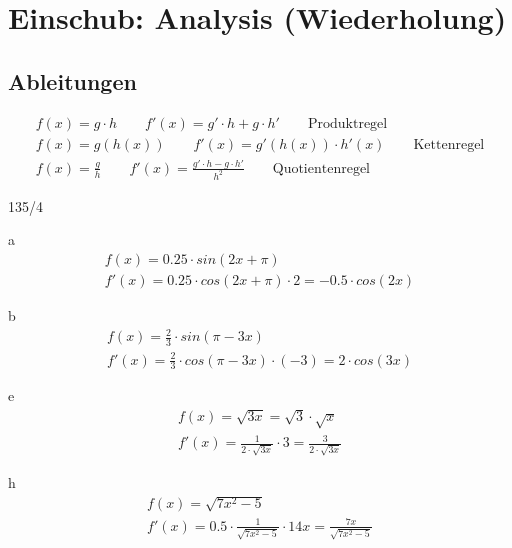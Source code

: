 \section*{Einschub: Analysis (Wiederholung)}
\subsection*{Ableitungen}
\begin{gather*}
  f(x) = g \cdot h \qquad f'(x) = g' \cdot h + g \cdot h' \qquad \text{Produktregel} \\
  f(x) = g(h(x)) \qquad f'(x) = g'(h(x)) \cdot h'(x) \qquad \text{Kettenregel} \\
  f(x) = \frac{g}{h} \qquad f'(x) = \frac{g' \cdot h - g \cdot h'}{h^2} \qquad \text{Quotientenregel}
\end{gather*}
\begin{exercise}{135/4}
  \item [a]
  \begin{gather*}
    f(x) = 0.25 \cdot sin(2x + \pi) \\
    f'(x) = 0.25 \cdot cos(2x + \pi) \cdot 2 = -0.5 \cdot cos(2x)
  \end{gather*}
  \item [b]
  \begin{gather*}
    f(x) = \frac{2}{3} \cdot sin(\pi - 3x) \\
    f'(x) = \frac{2}{3} \cdot cos(\pi - 3x) \cdot (-3) = 2 \cdot cos(3x)
  \end{gather*}
  \item [e]
  \begin{gather*}
    f(x) = \sqrt{3x} = \sqrt{3} \cdot \sqrt{x} \\
    f'(x) = \frac{1}{2 \cdot \sqrt{3x}} \cdot 3 = \frac{3}{2 \cdot \sqrt{3x}}
  \end{gather*}
  \item [h]
  \begin{gather*}
    f(x) = \sqrt{7x^2 - 5} \\
    f'(x) = 0.5 \cdot \frac{1}{\sqrt{7x^2 - 5}} \cdot 14x = \frac{7x}{\sqrt{7x^2 - 5}}
  \end{gather*}
\end{exercise}
